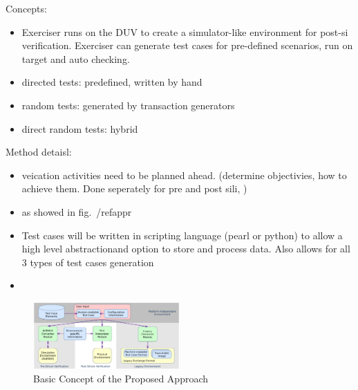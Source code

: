 \documentclass[conference]{IEEEtran}
\begin{document}
Concepts: 
\begin{itemize}
\item Exerciser runs on the DUV to create a simulator-like environment for post-si verification. Exerciser can generate test cases for pre-defined scenarios, run on target and auto checking. 
\item directed tests: predefined, written by hand
\item random tests: generated by transaction generators
\item direct random tests: hybrid
\end{itemize}

Method detaisl: 
\begin{itemize}
\item veication activities need to be planned ahead. (determine objectivies, how to achieve them. Done seperately for pre and post sili, \color{red}{may cause problems})
\item as showed in fig.~/ref{appr}
\item Test cases will be written in scripting language (pearl or python) to allow a high level abstractionand option to store and process data. Also allows for all 3 types of test cases generation
\item 
\end{itemize}

\begin{figure}
 \caption{Basic Concept of the Proposed Approach}
\label{appr}
\centering
    \includegraphics[width=0.5\textwidth]{appr}
\end{figure}
\end{document}
